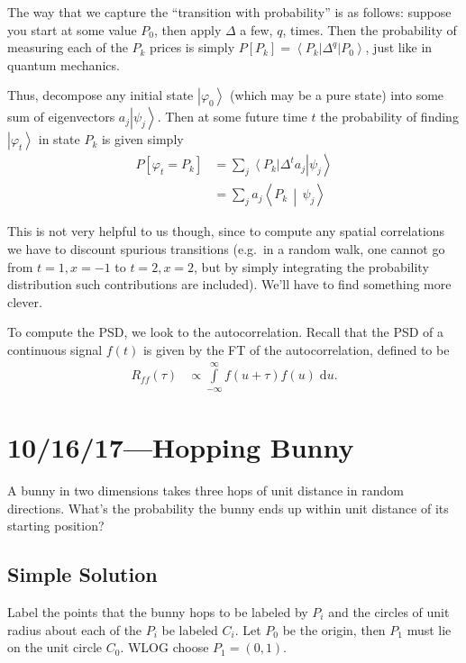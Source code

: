 \documentclass[12pt]{report}
\newcommand{\bra}[1]{\left<#1\right|}
\newcommand{\ket}[1]{\left|#1\right>}
\newcommand{\dotp}[2]{\left<#1\,\middle|\,#2\right>}
\begin{document}
The way that we capture the ``transition with probability'' is as follows:
suppose you start at some value $P_0$, then apply $\Delta$ a few, $q$,
times. Then the probability of measuring each of the $P_k$ prices is simply
$P[P_k] = \bra{P_k}\Delta^q\ket{P_0}$, just like in quantum mechanics.

Thus, decompose any initial state $\ket{\varphi_0}$ (which may be a pure state)
into some sum of eigenvectors $a_j\ket{\psi_j}$. Then at some future time $t$
the probability of finding $\ket{\varphi_t}$ in state $P_k$ is given simply
\begin{align}
    P[\varphi_t = P_k]
        &= \sum\limits_{j}^{} \bra{P_k}\Delta^t a_j\ket{\psi_j} \nonumber\\
        &= \sum\limits_{j}^{} a_j\dotp{P_k}{\psi_j}
\end{align}

This is not very helpful to us though, since to compute any spatial correlations
we have to discount spurious transitions (e.g.\ in a random walk, one cannot go
from $t=1, x=-1$ to $t=2, x=2$, but by simply integrating the probability
distribution such contributions are included). We'll have to find something more
clever.

To compute the PSD, we look to the autocorrelation. Recall that the PSD of a
continuous signal $f(t)$ is given by the FT of the autocorrelation, defined to
be
\begin{align}
    R_{ff}(\tau) &\propto \int\limits_{-\infty}^{\infty}f(u + \tau) f(u)
        \;\mathrm{d}u.
\end{align}

\chapter{10/16/17---Hopping Bunny}

A bunny in two dimensions takes three hops of unit distance in random
directions. What's the probability the bunny ends up within unit distance of its
starting position?

\section{Simple Solution}\label{s:10/16/17.simple}

Label the points that the bunny hops to be labeled by $P_i$ and the circles of
unit radius about each of the $P_i$ be labeled $C_i$. Let $P_0$ be the origin,
then $P_1$ must lie on the unit circle $C_0$. WLOG choose $P_1 = (0, 1)$.
\end{document}
